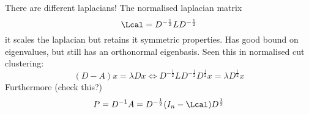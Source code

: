 \documentclass[a4paper]{article}
\begin{document}

There are different laplacians! The normalised laplacian matrix
\[\Lcal = D^{-\frac{1}{2}} L D^{-\frac{1}{2}} \]
it scales the laplacian but retains it symmetric properties. Has good bound on
eigenvalues, but still has an orthonormal eigenbasis. Seen this in normalised
cut clustering:
\[
(D-A) x
= \lambda D x 
\Leftrightarrow
D^{-\frac{1}{2}} L D^{-\frac{1}{2}} D^\frac{1}{2} x
= \lambda D^\frac{1}{2} x
\]
Furthermore (check this?)
\[
P
= D^{-1} A
= D^{-\frac{1}{2}}(I_n - \Lcal)D^\frac{1}{2}
\]


\end{document}
